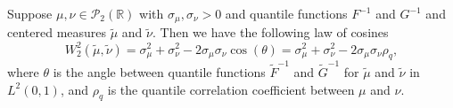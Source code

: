 \documentclass[10pt,a4paper]{amsart}
\begin{document}
\begin{lemma}\label{WTaylorDiagram}
Suppose $\mu, \nu \in \mathcal{P}_2(\mathbb{R})$ with $\sigma_\mu,\sigma_\nu>0$ and quantile functions $ F^{-1}$ and $G^{-1}$ and centered measures $\widetilde{\mu} $ and $ \widetilde{\nu}$. Then we have the following law of cosines 
\begin{equation}\label{eqn:WTaylorDiagram}
    W_2^2(\widetilde{\mu}, \widetilde{\nu})  = \sigma_\mu^2 + \sigma_\nu^2 -2 \sigma_\mu \sigma_\nu \cos(\theta) = \sigma_\mu^2 + \sigma_\nu^2 -2 \sigma_\mu \sigma_\nu \rho_q ,
\end{equation}
where $\theta$ is the angle between quantile functions $\widetilde{F}^{-1}$ and $\widetilde{G}^{-1}$ for $\widetilde{\mu}$ and $ \widetilde{\nu}$  in $L^2(0,1)$, and $\rho_q$ is the quantile correlation coefficient between $\mu$ and $\nu$. 
\end{lemma}
\end{document}
